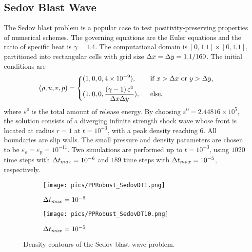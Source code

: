 \subsection{Sedov Blast Wave}

The Sedov blast problem \cite{zhang2012positivity,vilar2016positivity} is a popular case to test positivity-preserving properties of
numerical schemes.
The governing equations are the Euler equations and the ratio of specific heat is $\gamma = 1.4$. The computational domain is $[0,1.1]\times[0,1.1]$, partitioned into rectangular cells with grid size $\mathrm\Delta x = \mathrm\Delta y = 1.1/160$. The initial conditions are
\begin{equation}
    (\rho,u,v,p) = \begin{dcases}
        (1,0,0,4\times 10 ^{-9}),\ \                                          & \text{if } x > \inc x \ \mathrm{or} \ y > \inc y, \\
        (1,0,0,\dfrac{\left(\gamma-1\right)\varepsilon^0}{\inc x\inc y}),\ \  & \text{else},                                      \\
    \end{dcases}
\end{equation}
where $\varepsilon^0$ is the total amount of release energy.
By choosing $\varepsilon^0= 2.44816\times 10^5$,
the solution consists of a diverging infinite strength shock wave
whose front is located at radius $r=1$ at $t=10^{-3}$, with a peak density reaching $6$.
All boundaries are slip walls.
The small pressure and density parameters are chosen to be $\varepsilon_\rho = \varepsilon_p = 10^{-11}$.
Two simulations are performed up to $t=10^{-3}$,
using $1020$ time steps with $\mathrm\Delta t_{max} = 10^{-6}$
and  $189$ time steps with $\mathrm\Delta t_{max} = 10^{-5}$, respectively.


\begin{figure}[htbp]
    \centering
    \begin{subfigure}{0.5\textwidth}
        \texttt{[image: pics/PPRobust\_SedovDT1.png]}
        \caption[]{$\mathrm\Delta t_{max}=10^{-6}$}
    \end{subfigure}\hfill
    \begin{subfigure}{0.5\textwidth}
        \texttt{[image: pics/PPRobust\_SedovDT10.png]}
        \caption[]{$\mathrm\Delta t_{max}=10^{-5}$}
    \end{subfigure}
    \caption{Density contours of the Sedov blast wave problem.}
    \label{fig:sedov}
\end{figure}

